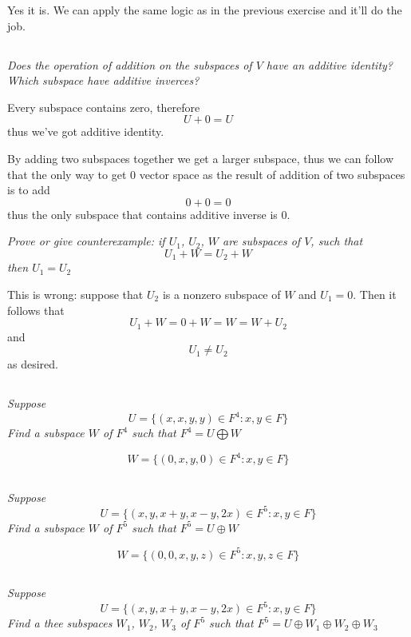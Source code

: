 \documentclass[10pt,oneside,titlepage]{book}
\begin{document}
Yes it is. We can apply the same logic as in the previous exercise and it'll do
the job.

\subsection{}

\textit{Does the operation of addition on the subspaces of $V$ have an additive
  identity? Which subspace have additive inverces?}

Every subspace contains zero, therefore
$$U + 0 = U$$
thus we've got additive identity.

By adding two subspaces together we get a larger subspace, thus we can follow
that the only way to get 0 vector space as the result of addition of two
subspaces is to add
$$0 + 0 = 0$$
thus the only subspace that contains additive inverse is $0$.

\textit{Prove or give counterexample: if $U_1$, $U_2$, $W$ are subspaces of
  $V$, such that }
$$U_1 + W = U_2 + W$$
\textit{then $U_1 = U_2$}

This is wrong: suppose that $U_2$ is a nonzero subspace of $W$ and $U_1 = 0$.
Then it follows that
$$U_1 + W = 0 + W = W = W + U_2$$
and
$$U_1 \neq U_2$$
as desired.

\subsection{}

\textit{Suppose}
$$U = \{(x, x, y, y) \in F^4: x, y \in F\}$$
\textit{Find a subspace $W$ of $F^4$ such that $F^4 = U \bigoplus W$ }

$$W = \{(0, x, y, 0) \in F^4: x, y \in F\}$$


\subsection{}

\textit{Suppose}
$$U = \{(x, y, x + y, x - y, 2x) \in F^5: x, y \in F\}$$
\textit{Find a subspace $W$ of $F^5$ such that $F^5 = U \oplus W$ }

$$W = \{(0, 0, x, y, z) \in F^5: x, y, z \in F\}$$

\subsection{}

\textit{Suppose}
$$U = \{(x, y, x + y, x - y, 2x) \in F^5: x, y \in F\}$$
\textit{Find a thee subspaces $W_1$, $W_2$, $W_3$ of $F^5$
  such that $F^5 = U \oplus W_1 \oplus W_2 \oplus W_3$ }
\end{document}
